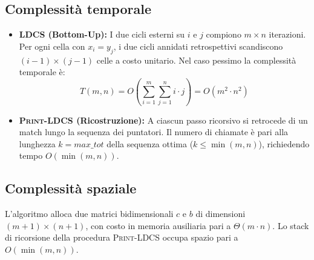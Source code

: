 \subsection{Complessità temporale}
\begin{itemize}
    \item \textbf{\textsc{LDCS} (Bottom-Up):} I due cicli esterni su $i$ e $j$ compiono $m \times n$ iterazioni. Per ogni cella con $x_i = y_j$, i due cicli annidati retrospettivi scandiscono $(i-1) \times (j-1)$ celle a costo unitario. Nel caso pessimo la complessità temporale è:
    \begin{equation*}
        T(m, n) = O\left( \sum_{i=1}^{m} \sum_{j=1}^{n} i \cdot j \right) = O(m^2 \cdot n^2)
    \end{equation*}
    \item \textbf{\textsc{Print-LDCS} (Ricostruzione):} A ciascun passo ricorsivo si retrocede di un match lungo la sequenza dei puntatori. Il numero di chiamate è pari alla lunghezza $k = \mathit{max\_tot}$ della sequenza ottima ($k \le \min(m, n)$), richiedendo tempo $O(\min(m, n))$.
\end{itemize}

\subsection{Complessità spaziale}
L'algoritmo alloca due matrici bidimensionali $c$ e $b$ di dimensioni $(m+1) \times (n+1)$, con costo in memoria ausiliaria pari a $\Theta(m \cdot n)$. Lo stack di ricorsione della procedura \textsc{Print-LDCS} occupa spazio pari a $O(\min(m, n))$.